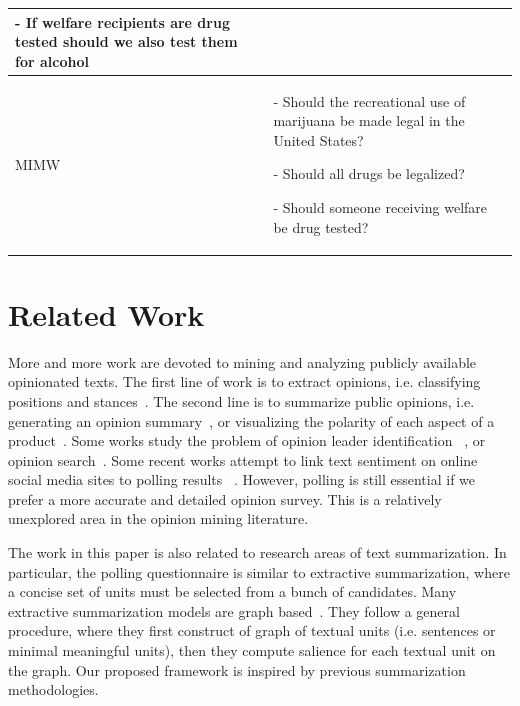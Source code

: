 \documentclass{llncs}
\begin{document}
\begin{table}[htp]
\begin{center}
\begin{tabular}{|p{2cm}|p{13cm}|}
- If welfare recipients are drug tested should we also test them for alcohol
\\\hline

MIMW
&

- Should the recreational use of marijuana be made legal in the United States?

- Should all drugs be legalized?

- Should someone receiving welfare be drug tested?
\\\hline

\end{tabular}
\end{center}
\label{tab:casestudy}
\end{table}%


\section{Related Work}\label{sec:relatedwork}
More and more work are devoted to mining and analyzing publicly available opinionated texts. The first line of work is to extract opinions, i.e. classifying positions and stances~\cite{Murakami2010Support}. The second line is to summarize public opinions, i.e. generating an opinion summary~\cite{Potthast2010Opinion}, or visualizing the polarity of each aspect of a product~\cite{Meng2012Entitycentric,Moghaddam2013FLDA}. Some works study the problem of opinion leader identification~\cite{song2007identifying} , or opinion search~\cite{Gerani2010Proximity}. Some recent works attempt to link text sentiment on online social media sites to polling results ~\cite{OConnor2010tweets,Lampos2013user}. However, polling is still essential if we prefer a more accurate and detailed opinion survey. This is a relatively unexplored area in the opinion mining literature.


The work in this paper is also related to research areas of text summarization. In particular, the polling questionnaire is similar to extractive summarization, where a concise set of units must be selected from a bunch of candidates. Many extractive summarization models are graph based~\cite{Mihalcea2004TextRank,Erkan2004LexRank,Gong2001Generic}. They follow a general procedure, where they first construct of graph of textual units (i.e. sentences or minimal meaningful units), then they compute salience for each textual unit on the graph. Our proposed framework is inspired by previous summarization methodologies.
\end{document}
